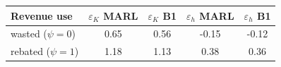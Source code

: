 \begin{tabular}{lcccc}
\toprule
Revenue use & $\varepsilon_K$ MARL & $\varepsilon_K$ B1 & $\varepsilon_h$ MARL & $\varepsilon_h$ B1\\
\midrule
wasted ($\psi=0$) & 0.65 & 0.56 & -0.15 & -0.12\\
rebated ($\psi=1$) & 1.18 & 1.13 & 0.38 & 0.36\\
\bottomrule
\end{tabular}
